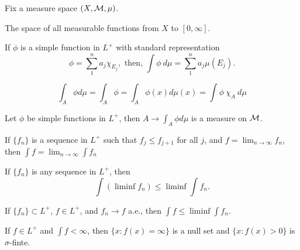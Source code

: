 Fix a measure space $(X, {\mathcal M}, \mu)$.
\begin{dfn}[$L^+$]
The space of all measurable functions from $X$ to $[0, \infty]$.
\end{dfn}

\begin{dfn} If $\phi$ is a simple function in $L^+$ with standard representation
 \[ \phi = \sum_1^n a_j \chi_{E_j}, \text{  then,  }  
\int \phi \ d \mu = \sum_1^n a_j \mu(E_j).
\]	
\end{dfn}

\begin{rmk}
\[
\int_A \phi d \mu = \int_A \phi = \int_A \phi(x) d \mu(x) = \int \phi \ \chi_A \ d \mu
\]	
\end{rmk}

\begin{prop}
Let $\phi$ be simple functions in $L^+$, then $A \rightarrow \int_A \phi d \mu$ is a measure on ${\mathcal M}$.	
\end{prop}

\begin{thm}
If $\{ f_n \}$ is a sequence in $L^+ $ such that $f_j \leq f_{j+1}$ for all $j$, and $f = \lim_{n \rightarrow \infty} f_n $, then $\int f = \lim_{n \rightarrow \infty} \int f_n$	
\end{thm}

\begin{thm}
	If $\{f_n\}$ is any sequence in $L^+$, then 
	\[
	\int(\liminf f_n) \leq \liminf \int f_n.
	\]
\end{thm}

\begin{cor}
If $\{ f_n \} \subset L^+$, $f \in L^+$, and $f_n \rightarrow f$ a.e., then $\int f \leq \liminf \int f_n$.	
\end{cor}

\begin{prop}
If $f \in L^+$ and $\int f < \infty$, then $\{ x : f(x) = \infty \}$ is a null set and $\{ x: f(x)>0  \}$ is $\sigma$-finte.	
\end{prop}






